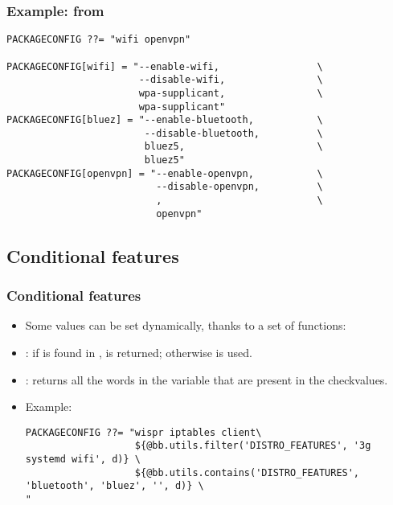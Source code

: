 \begin{frame}[fragile]
  \frametitle{Example: from }
  \begin{block}{}
  \begin{verbatim}
PACKAGECONFIG ??= "wifi openvpn"

PACKAGECONFIG[wifi] = "--enable-wifi,                 \
                       --disable-wifi,                \
                       wpa-supplicant,                \
                       wpa-supplicant"
PACKAGECONFIG[bluez] = "--enable-bluetooth,           \
                        --disable-bluetooth,          \
                        bluez5,                       \
                        bluez5"
PACKAGECONFIG[openvpn] = "--enable-openvpn,           \
                          --disable-openvpn,          \
                          ,                           \
                          openvpn"
  \end{verbatim}
  \end{block}
\end{frame}

\subsection{Conditional features}

\begin{frame}[fragile]
  \frametitle{Conditional features}
  \begin{itemize}
    \item Some values can be set dynamically, thanks to a set of
      functions:
    \item {}: if  is found in
      \code{variable},  is returned; otherwise
       is used.
    \item {}: returns
      all the words in the variable that are present in the
      checkvalues.
    \item Example:
      \begin{block}{}
      \fontsize{9}{9}\selectfont
      \begin{verbatim}
PACKAGECONFIG ??= "wispr iptables client\
                   ${@bb.utils.filter('DISTRO_FEATURES', '3g systemd wifi', d)} \
                   ${@bb.utils.contains('DISTRO_FEATURES', 'bluetooth', 'bluez', '', d)} \
"
      \end{verbatim}
      \end{block}
  \end{itemize}
\end{frame}

